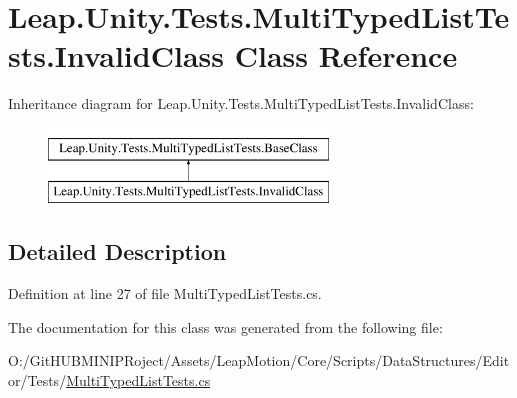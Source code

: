 \hypertarget{class_leap_1_1_unity_1_1_tests_1_1_multi_typed_list_tests_1_1_invalid_class}{}\section{Leap.\+Unity.\+Tests.\+Multi\+Typed\+List\+Tests.\+Invalid\+Class Class Reference}
\label{class_leap_1_1_unity_1_1_tests_1_1_multi_typed_list_tests_1_1_invalid_class}
Inheritance diagram for Leap.\+Unity.\+Tests.\+Multi\+Typed\+List\+Tests.\+Invalid\+Class\+:\begin{figure}[H]
\begin{center}
\leavevmode
\includegraphics[height=2.000000cm]{class_leap_1_1_unity_1_1_tests_1_1_multi_typed_list_tests_1_1_invalid_class}
\end{center}
\end{figure}


\subsection{Detailed Description}


Definition at line 27 of file Multi\+Typed\+List\+Tests.\+cs.



The documentation for this class was generated from the following file\+:\begin{DoxyCompactItemize}
\item 
O\+:/\+Git\+H\+U\+B\+M\+I\+N\+I\+P\+Roject/\+Assets/\+Leap\+Motion/\+Core/\+Scripts/\+Data\+Structures/\+Editor/\+Tests/\mbox{\hyperlink{_multi_typed_list_tests_8cs}{Multi\+Typed\+List\+Tests.\+cs}}\end{DoxyCompactItemize}
